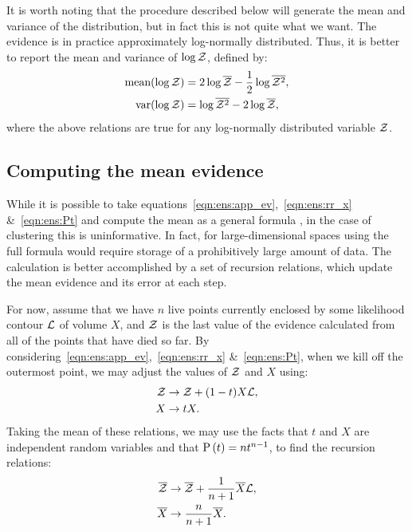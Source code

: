 It is worth noting that the procedure described below will generate the mean and variance of the distribution, but in fact this is not quite what we want. The evidence is in practice approximately log-normally distributed. Thus, it is better to report the mean and variance of \(\log\mathcal{Z}\), defined by:
\begin{align}
  \text{mean}(\log\mathcal{Z}) &= 2\log\overline{\mathcal{Z}} - \frac{1}{2}\log\overline{\mathcal{Z}^2},\\
  \text{var}(\log\mathcal{Z}) &= \log\overline{\mathcal{Z}^2}-2\log\overline{\mathcal{Z}},
\end{align}
where the above relations are true for any log-normally distributed variable \(\mathcal{Z}\).


\subsection{Computing the mean evidence}
\label{sec:ens:basic_mean}

While it is possible to take equations~\eqref{eqn:ens:app_ev},~\eqref{eqn:ens:rr_x} \&~\eqref{eqn:ens:Pt} and compute the mean as a general formula \citep{Keeton}, in the case of clustering this is uninformative. 
In fact, for large-dimensional spaces using the full formula would require storage of a prohibitively large amount of data. The calculation is better accomplished by a set of recursion relations, which update the mean evidence and its error at each step. 

For now, assume that we have \(n\) live points currently enclosed by some likelihood contour \(\mathcal{L}\) of volume \(X\), and \(\mathcal{Z}\) is the last value of the evidence calculated from all of the points that have died so far. By considering~\eqref{eqn:ens:app_ev},~\eqref{eqn:ens:rr_x} \&~\eqref{eqn:ens:Pt}, when we kill off the outermost point, we may adjust the values of \(\mathcal{Z}\) and \(X\) using:
%
\begin{align}                                                         
\mathcal{Z} &\to \mathcal{Z} + (1-t)X\mathcal{L},
\label{eqn:ens:rr_Z}
\\
X &\to tX.
\label{eqn:ens:rr_X}
\end{align}
%
Taking the mean of these relations, we may use the facts that \(t\) and \(X\) are independent random variables and that \(\mathrm{P}\left(t\right) = n t^{n-1}\), to find the recursion relations:
\begin{align}
  \overline{\mathcal{Z}} &\to \overline{\mathcal{Z}} + \frac{1}{n+1}\overline{X}\mathcal{L},
  \label{eqn:ens:rr_Zb}
  \\
  \overline{X} &\to \frac{n}{n+1}\overline{X}.
  \label{eqn:ens:rr_Xb}
\end{align}
%

